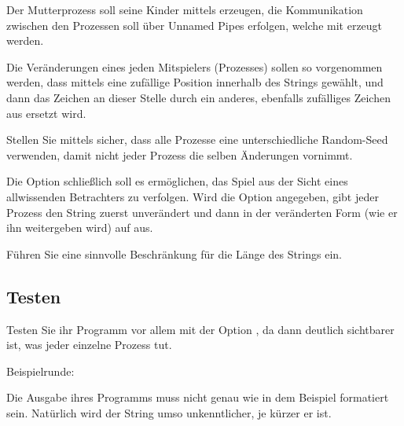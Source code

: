 Der Mutterprozess soll seine Kinder mittels 
erzeugen, die Kommunikation zwischen den Prozessen soll über Unnamed
Pipes erfolgen, welche mit  erzeugt werden.

Die Veränderungen eines jeden Mitspielers (Prozesses) sollen so
vorgenommen werden, dass mittels  eine zufällige
Position innerhalb des Strings gewählt, und dann das Zeichen an
dieser Stelle durch ein anderes, ebenfalls zufälliges Zeichen aus
\osueregex{[a-zA-Z]} ersetzt wird.

Stellen Sie mittels  sicher, dass alle Prozesse eine
unterschiedliche Random-Seed verwenden, damit nicht jeder Prozess die
selben Änderungen vornimmt.

Die Option  schließlich soll es ermöglichen, das Spiel aus
der Sicht eines allwissenden Betrachters zu verfolgen. Wird die Option
angegeben, gibt jeder Prozess den String zuerst unverändert und dann
in der veränderten Form (wie er ihn weitergeben wird) auf
 aus.

Führen Sie eine sinnvolle Beschränkung für die Länge des Strings
ein.

\subsection*{Testen}

Testen Sie ihr Programm vor allem mit der Option , da dann
deutlich sichtbarer ist, was jeder einzelne Prozess tut.

Beispielrunde:


Die Ausgabe ihres Programms muss nicht genau wie in dem Beispiel
formatiert sein. Natürlich wird der String umso unkenntlicher, je
kürzer er ist.

\osueguidelinestwo


